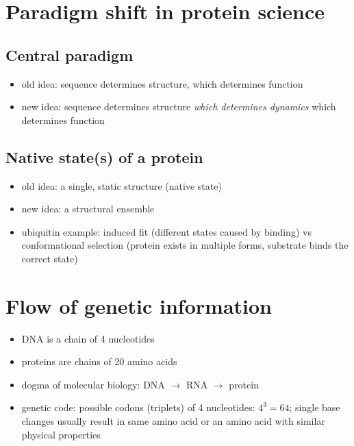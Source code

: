 \documentclass[10pt]{article}
\newenvironment{mitemize}
{
  \begin{itemize}
  \setlength{\itemsep}{1pt}
  \setlength{\parskip}{0pt}
  \setlength{\parsep}{0pt}}{\end{itemize}
}
\begin{document}
\section*{Paradigm shift in protein science}
  \subsection*{Central paradigm}
    \begin{mitemize}
      \item old idea: sequence determines structure, which determines function
      \item new idea: sequence determines structure \textit{which determines dynamics} which determines function
    \end{mitemize}
  
  \subsection*{Native state(s) of a protein}
    \begin{mitemize}
      \item old idea: a single, static structure (native state)
      \item new idea: a structural ensemble
      \item ubiquitin example: induced fit (different states caused by binding) vs conformational selection (protein exists in multiple forms, substrate binds the correct state)
    \end{mitemize}

\section*{Flow of genetic information}
  \begin{mitemize}
    \item DNA is a chain of 4 nucleotides
    \item proteins are chains of 20 amino acids
    \item dogma of molecular biology: DNA $\rightarrow$ RNA $\rightarrow$ protein
    \item genetic code: possible codons (triplets) of 4 nucleotides: $4^3 = 64$; single base changes usually result in same amino acid or an amino acid with similar physical properties
  \end{mitemize}
  
\end{document}
